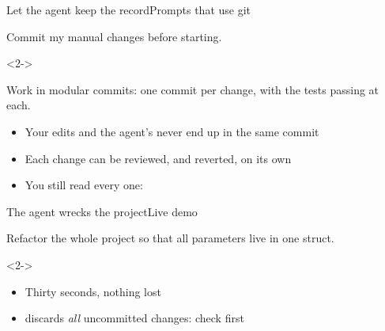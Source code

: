 \begin{frame}[fragile]{Let the agent keep the record}{Prompts that use git}
\begin{prompt}
Commit my manual changes before starting.
\end{prompt}
\begin{visibleenv}<2->
\begin{prompt}
Work in modular commits: one commit per change, with the tests passing at each.
\end{prompt}
\end{visibleenv}
  \begin{itemize}
    \item Your edits and the agent's never end up in the same commit
    \item<2-> Each change can be reviewed, and reverted, on its own
    \item<4-> You still read every one: 
  \end{itemize}
\end{frame}

\begin{frame}[fragile]{The agent wrecks the project}{Live demo}
\begin{prompt}
Refactor the whole project so that all parameters live in one struct.
\end{prompt}
\begin{onlyenv}<2->
\end{onlyenv}
  \begin{itemize}
    \item<3-> Thirty seconds, nothing lost
    \item<4->  discards \emph{all} uncommitted changes: check first
  \end{itemize}
\end{frame}


